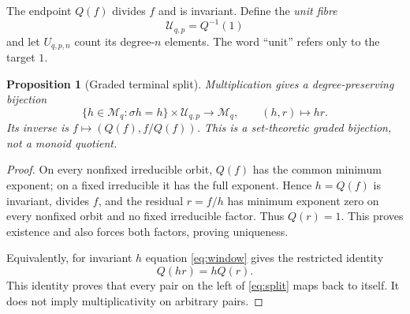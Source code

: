 \documentclass[10pt,a4paper]{amsart}
\newtheorem{proposition}[theorem]{Proposition}
\theoremstyle{definition}
\theoremstyle{remark}
\newcommand{\Mon}{\mathcal M}
\newcommand{\Res}{\mathcal U}
\begin{document}
The endpoint $Q(f)$ divides $f$ and is invariant.  Define the
\emph{unit fibre}
\[
                    \Res_{q,p}=Q^{-1}(1)
\]
and let $U_{q,p,n}$ count its degree-$n$ elements.  The word ``unit'' refers
only to the target $1$.

\begin{proposition}[Graded terminal split]\label{prop:split}
Multiplication gives a degree-preserving bijection
\begin{equation}\label{eq:split}
 \{h\in\Mon_q:\sigma h=h\}\times\Res_{q,p}
       \longrightarrow \Mon_q,\qquad (h,r)\longmapsto hr.
\end{equation}
Its inverse is $f\mapsto(Q(f),f/Q(f))$.  This is a set-theoretic graded
bijection, not a monoid quotient.
\end{proposition}

\begin{proof}
On every nonfixed irreducible orbit, $Q(f)$ has the common minimum exponent;
on a fixed irreducible it has the full exponent.  Hence $h=Q(f)$ is
invariant, divides $f$, and the residual $r=f/h$ has minimum exponent zero
on every nonfixed orbit and no fixed irreducible factor.  Thus $Q(r)=1$.
This proves existence and also forces both factors, proving uniqueness.

Equivalently, for invariant $h$ equation \eqref{eq:window} gives the
restricted identity
\begin{equation}\label{eq:restricted}
                    Q(hr)=hQ(r).
\end{equation}
This identity proves that every pair on the left of \eqref{eq:split} maps
back to itself.  It does not imply multiplicativity on arbitrary pairs.
\end{proof}
\end{document}
